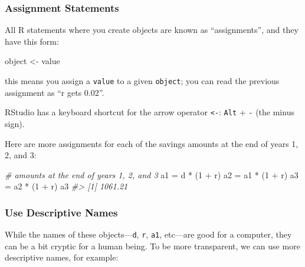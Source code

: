 \documentclass[
]{book}
\newenvironment{Shaded}{\begin{snugshade}}{\end{snugshade}}
\newcommand{\CommentTok}[1]{\textcolor[rgb]{0.56,0.35,0.01}{\textit{#1}}}
\newcommand{\DecValTok}[1]{\textcolor[rgb]{0.00,0.00,0.81}{#1}}
\newcommand{\NormalTok}[1]{#1}
\newcommand{\OtherTok}[1]{\textcolor[rgb]{0.56,0.35,0.01}{#1}}
\newcommand{\SpecialCharTok}[1]{\textcolor[rgb]{0.00,0.00,0.00}{#1}}
\begin{document}
\hypertarget{assignment-statements}{%
\subsubsection*{Assignment Statements}\label{assignment-statements}}

All R statements where you create objects are known as ``assignments'', and they
have this form:

\begin{Shaded}
\begin{Highlighting}[]
\NormalTok{object }\OtherTok{\textless{}{-}}\NormalTok{ value}
\end{Highlighting}
\end{Shaded}

this means you assign a \texttt{value} to a given \texttt{object};
you can read the previous assignment as ``r gets 0.02''.

RStudio has a keyboard shortcut for the arrow operator \texttt{\textless{}-}:
\texttt{Alt} + \texttt{-} (the minus sign).

Here are more assignments for each of the savings amounts at the end of years
1, 2, and 3:

\begin{Shaded}
\begin{Highlighting}[]
\CommentTok{\# amounts at the end of years 1, 2, and 3}
\NormalTok{a1 }\OtherTok{=}\NormalTok{ d }\SpecialCharTok{*}\NormalTok{ (}\DecValTok{1} \SpecialCharTok{+}\NormalTok{ r)}
\NormalTok{a2 }\OtherTok{=}\NormalTok{ a1 }\SpecialCharTok{*}\NormalTok{ (}\DecValTok{1} \SpecialCharTok{+}\NormalTok{ r)}
\NormalTok{a3 }\OtherTok{=}\NormalTok{ a2 }\SpecialCharTok{*}\NormalTok{ (}\DecValTok{1} \SpecialCharTok{+}\NormalTok{ r)}
\NormalTok{a3}
\CommentTok{\#\textgreater{} [1] 1061.21}
\end{Highlighting}
\end{Shaded}

\hypertarget{use-descriptive-names}{%
\subsubsection*{Use Descriptive Names}\label{use-descriptive-names}}

While the names of these objects---\texttt{d}, \texttt{r}, \texttt{a1}, etc---are good for a
computer, they can be a bit cryptic for a human being. To be more transparent,
we can use more descriptive names, for example:
\end{document}
